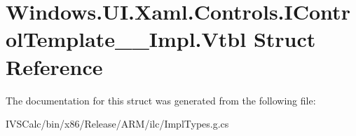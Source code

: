 \hypertarget{struct_windows_1_1_u_i_1_1_xaml_1_1_controls_1_1_i_control_template_____impl_1_1_vtbl}{}\section{Windows.\+U\+I.\+Xaml.\+Controls.\+I\+Control\+Template\+\_\+\+\_\+\+Impl.\+Vtbl Struct Reference}
\label{struct_windows_1_1_u_i_1_1_xaml_1_1_controls_1_1_i_control_template_____impl_1_1_vtbl}


The documentation for this struct was generated from the following file\+:\begin{DoxyCompactItemize}
\item 
I\+V\+S\+Calc/bin/x86/\+Release/\+A\+R\+M/ilc/Impl\+Types.\+g.\+cs\end{DoxyCompactItemize}
